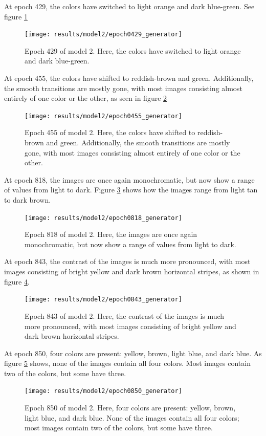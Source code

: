 \documentclass[11pt,letterpaper]{article}
\begin{document}
				At epoch 429, the colors have switched to light orange and dark blue-green.
				See figure \ref{fig:cgvg:epoch0429generator}
				\begin{figure}
					\centering
					\texttt{[image: results/model2/epoch0429\_generator]}
					\caption{Epoch 429 of model 2. Here, the colors have switched to light orange and dark blue-green.}
					\label{fig:cgvg:epoch0429generator}
				\end{figure}

				At epoch 455, the colors have shifted to reddish-brown and green.
				Additionally, the smooth transitions are mostly gone, with most images consisting almost entirely of one color or the other, as seen in figure \ref{fig:cgvg:epoch0455generator}
				\begin{figure}
					\centering
					\texttt{[image: results/model2/epoch0455\_generator]}
					\caption{Epoch 455 of model 2. Here, the colors have shifted to reddish-brown and green. Additionally, the smooth transitions are mostly gone, with most images consisting almost entirely of one color or the other.}
					\label{fig:cgvg:epoch0455generator}
				\end{figure}

				At epoch 818, the images are once again monochromatic, but now show a range of values from light to dark.
				Figure \ref{fig:cgvg:epoch0818generator} shows how the images range from light tan to dark brown.
				\begin{figure}
					\centering
					\texttt{[image: results/model2/epoch0818\_generator]}
					\caption{Epoch 818 of model 2. Here, the images are once again monochromatic, but now show a range of values from light to dark.}
					\label{fig:cgvg:epoch0818generator}
				\end{figure}

				At epoch 843, the contrast of the images is much more pronounced, with most images consisting of bright yellow and dark brown horizontal stripes, as shown in figure \ref{fig:cgvg:epoch0843generator}.
				\begin{figure}
					\centering
					\texttt{[image: results/model2/epoch0843\_generator]}
					\caption{Epoch 843 of model 2. Here, the contrast of the images is much more pronounced, with most images consisting of bright yellow and dark brown horizontal stripes.}
					\label{fig:cgvg:epoch0843generator}
				\end{figure}

				At epoch 850, four colors are present: yellow, brown, light blue, and dark blue.
				As figure \ref{fig:cgvg:epoch0850generator} shows, none of the images contain all four colors.
				Most images contain two of the colors, but some have three.
				\begin{figure}
					\centering
					\texttt{[image: results/model2/epoch0850\_generator]}
					\caption{Epoch 850 of model 2. Here, four colors are present: yellow, brown, light blue, and dark blue. None of the images contain all four colors; most images contain two of the colors, but some have three.}
					\label{fig:cgvg:epoch0850generator}
				\end{figure}
\end{document}
